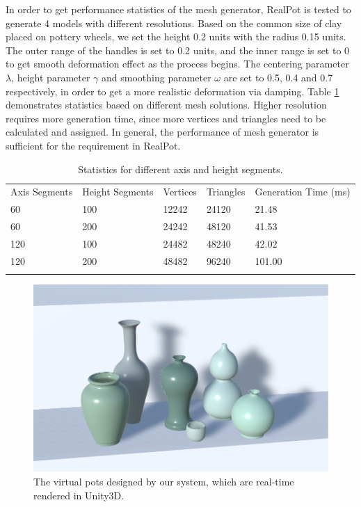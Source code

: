 \documentclass{svjour3}                     %
\begin{document}
In order to get performance statistics of the mesh generator, RealPot is tested to generate 4 models with different resolutions.
Based on the common size of clay placed on pottery wheels, we set the height 0.2 units with the radius 0.15 units.
The outer range of the handles is set to 0.2 units, and the inner range is set to 0 to get smooth deformation effect as the process begins. The centering parameter $\lambda$, height parameter $\gamma$ and smoothing parameter $\omega$ are set to 0.5, 0.4 and 0.7 respectively, in order to get a more realistic deformation via damping.
Table \ref{tab:stats} demonstrates statistics based on different mesh solutions. Higher resolution requires more generation time, since more vertices and triangles need to be calculated and assigned. In general, the performance of mesh generator is sufficient for the requirement in RealPot.

\begin{table}
\caption{Statistics for different axis and height segments.}
\label{tab:stats}       %
\begin{tabular}{lllll}
\hline\noalign{\smallskip}
Axis Segments & Height Segments & Vertices & Triangles & Generation Time (ms)\\
\noalign{\smallskip}\hline\noalign{\smallskip}
60 & 100 & 12242 & 24120 & 21.48 \\
60 & 200 & 24242 & 48120 & 41.53 \\
120 & 100 & 24482 & 48240 & 42.02 \\
120 & 200 & 48482 & 96240 & 101.00 \\
\noalign{\smallskip}\hline
\end{tabular}
\end{table}

\begin{figure}
\includegraphics[width=\textwidth]{fig11}
\caption{The virtual pots designed by our system, which are real-time rendered in Unity3D.}
\label{fig:pots}
\end{figure}
\end{document}
